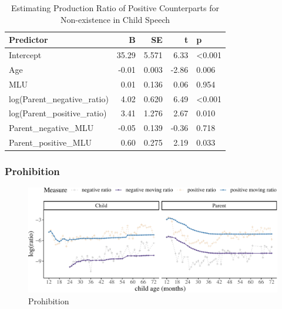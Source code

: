 \documentclass[
  english,
  man,floatsintext]{apa6}
\begin{document}
\begin{table}

\caption{\label{tab:unnamed-chunk-3}Estimating Production Ratio of Positive Counterparts for Non-existence in Child Speech}
\centering
\begin{tabular}[t]{l|r|r|r|l}
\hline
Predictor & B & SE & t & p\\
\hline
Intercept & 35.29 & 5.571 & 6.33 & <0.001\\
\hline
Age & -0.01 & 0.003 & -2.86 & 0.006\\
\hline
MLU & 0.01 & 0.136 & 0.06 & 0.954\\
\hline
log(Parent\_negative\_ratio) & 4.02 & 0.620 & 6.49 & <0.001\\
\hline
log(Parent\_positive\_ratio) & 3.41 & 1.276 & 2.67 & 0.010\\
\hline
Parent\_negative\_MLU & -0.05 & 0.139 & -0.36 & 0.718\\
\hline
Parent\_positive\_MLU & 0.60 & 0.275 & 2.19 & 0.033\\
\hline
\end{tabular}
\end{table}

\clearpage

\hypertarget{prohibition}{%
\subsubsection{Prohibition}\label{prohibition}}

\begin{figure}[H]

{\centering \includegraphics{results_files/figure-latex/prohibition-1} 

}

\caption{Prohibition}\label{fig:prohibition}
\end{figure}

\clearpage
\end{document}
